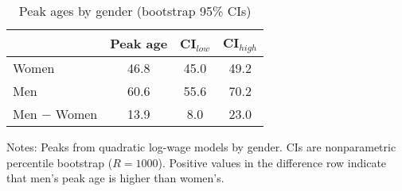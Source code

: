 \begin{table}[!htbp]
\centering
\caption{Peak ages by gender (bootstrap 95\% CIs)}\label{tab:peakages}
\begin{tabular}{lccc}
\toprule
 & Peak age & CI$_{low}$ & CI$_{high}$ \\
\midrule
Women & 46.8 & 45.0 & 49.2 \\
Men & 60.6 & 55.6 & 70.2 \\
\midrule
Men $-$ Women & 13.9 & 8.0 & 23.0 \\
\bottomrule
\end{tabular}
\begin{flushleft}\footnotesize
Notes: Peaks from quadratic log-wage models by gender. CIs are nonparametric percentile bootstrap ($R=1000$). 
Positive values in the difference row indicate that men's peak age is higher than women's.
\end{flushleft}
\end{table}
